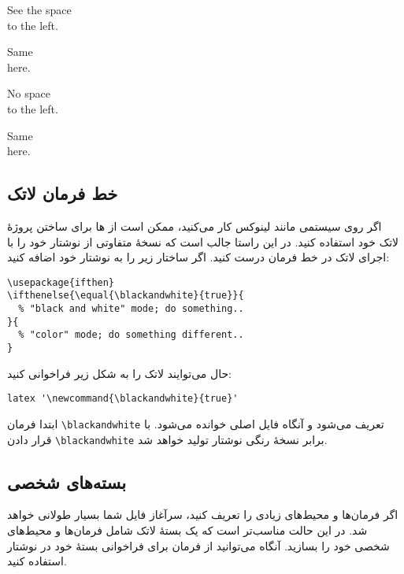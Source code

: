 \begin{example}
\newenvironment{simple}%
 {\noindent}%
 {\par\noindent}

\begin{simple}
See the space\\to the left.
\end{simple}
Same\\here.
\end{example}

\begin{example}
\newenvironment{correct}%
 {\noindent\ignorespaces}%
 {\par\noindent%
   \ignorespacesafterend}

\begin{correct}
No space\\to the left.
\end{correct}
Same\\here.
\end{example}

\subsection{خط فرمان لاتک}

اگر روی سیستمی مانند لینوکس کار می‌کنید، ممکن است از ها برای ساختن پروژهٔ لاتک خود استفاده کنید. 
در این راستا جالب است که نسخهٔ متفاوتی از نوشتار‌ خود را با اجرای لاتک در خط فرمان درست کنید. اگر ساختار زیر را به نوشتار‌ خود اضافه کنید:

\setLR
\begin{verbatim}
\usepackage{ifthen}
\ifthenelse{\equal{\blackandwhite}{true}}{
  % "black and white" mode; do something..
}{
  % "color" mode; do something different..
}
\end{verbatim}
\setRL
حال می‌توایند لاتک را به شکل زیر فراخوانی کنید:

\setLR
\begin{verbatim}
latex '\newcommand{\blackandwhite}{true}'
\end{verbatim}
\setRL

ابتدا فرمان \verb|\blackandwhite| تعریف می‌شود و آنگاه فایل اصلی خوانده می‌شود. با قرار دادن \verb|\blackandwhite| برابر  نسخهٔ رنگی نوشتار‌ تولید خواهد شد.
\subsection{بسته‌های شخصی}
اگر فرمان‌ها و محیط‌های زیادی را تعریف کنید، سرآغاز فایل شما بسیار طولانی خواهد شد. در این حالت مناسب‌تر است که یک بستهٔ لاتک شامل فرمان‌ها و محیط‌های شخصی خود را بسازید. آنگاه می‌توانید از فرمان  برای فراخوانی بستهٔ خود در نوشتار‌ استفاده کنید.


